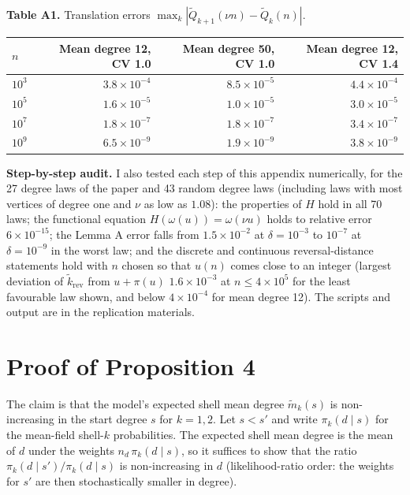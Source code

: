 \documentclass{nws}
\begin{document}
\begin{table}[h]
\centering
\textbf{Table A1.} Translation errors $\max_k|\tilde Q_{k+1}(\nu n)-\tilde Q_k(n)|$.

\vspace{4pt}
{\small\sf\sansmath
\begin{tabular}{lrrr}
\toprule
$n$ & Mean degree 12, CV 1.0 & Mean degree 50, CV 1.0 & Mean degree 12, CV 1.4\\
\midrule
$10^3$ & $3.8\times10^{-4}$ & $8.5\times10^{-5}$ & $4.4\times10^{-4}$\\
$10^5$ & $1.6\times10^{-5}$ & $1.0\times10^{-5}$ & $3.0\times10^{-5}$\\
$10^7$ & $1.8\times10^{-7}$ & $1.8\times10^{-7}$ & $3.4\times10^{-7}$\\
$10^9$ & $6.5\times10^{-9}$ & $1.9\times10^{-9}$ & $3.8\times10^{-9}$\\
\bottomrule
\end{tabular}
\par}
\end{table}

\textbf{Step-by-step audit.} I also tested each step of this appendix numerically, for the 27 degree laws of the paper and 43 random degree laws (including laws with most vertices of degree one and $\nu$ as low as $1.08$): the properties of $H$ hold in all 70 laws; the functional equation $H(\omega(u))=\omega(\nu u)$ holds to relative error $6\times10^{-15}$; the Lemma A error falls from $1.5\times10^{-2}$ at $\delta=10^{-3}$ to $10^{-7}$ at $\delta=10^{-9}$ in the worst law; and the discrete and continuous reversal-distance statements hold with $n$ chosen so that $u(n)$ comes close to an integer (largest deviation of $\tilde k_{\mathrm{rev}}$ from $u+\pi(u)$ $1.6\times10^{-3}$ at $n\le4\times10^5$ for the least favourable law shown, and below $4\times10^{-4}$ for mean degree 12). The scripts and output are in the replication materials.


\section{Proof of Proposition 4}

The claim is that the model's expected shell mean degree $\tilde m_k(s)$ is non-increasing in the start degree $s$ for $k=1,2$. Let $s<s'$ and write $\pi_k(d\mid s)$ for the mean-field shell-$k$ probabilities. The expected shell mean degree is the mean of
$d$ under the weights $n_d\,\pi_k(d\mid s)$, so it suffices to show that the ratio
$\pi_k(d\mid s')/\pi_k(d\mid s)$ is non-increasing in $d$ (likelihood-ratio order:
the weights for $s'$ are then stochastically smaller in degree).
\end{document}
